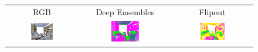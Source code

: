     \begin{figure}[h!]
        \centering
        \begin{tabular}{ccc}
            RGB & Deep Ensembles & Flipout \\
            \includegraphics[width=0.33\textwidth, height=0.18\textheight]{images/seg_output/s3dis_DE/S3DIS_1_RGB.pdf} &
            \includegraphics[width=0.33\textwidth, height=0.18\textheight]{images/seg_output/s3dis_DE/S3DIS_1_Pred.pdf} &
            \includegraphics[width=0.33\textwidth, height=0.18\textheight]{images/seg_output/s3dis_DE/office_3.pdf} \\


\end{tabular}
\end{figure}
